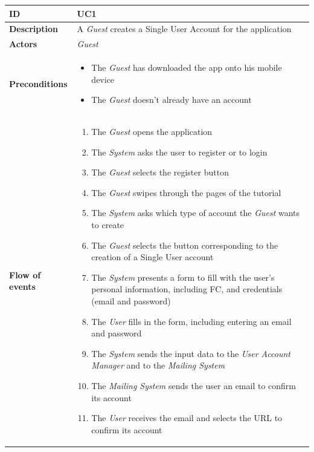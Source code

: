 \documentclass[titlepage]{article}
\begin{document}
			\begin{longtable}{| p{3 cm} | p{10 cm} |} 
			\hline
			{\bf ID} & UC1 \\
			\hline
			{\bf Description} & A {\it Guest} creates a Single User Account for the application \\
			\hline
			{\bf Actors} & {\it Guest} \\
			\hline
			{\bf Preconditions} & 		
							\begin{itemize}
								\item The {\it Guest}  has downloaded the app onto his mobile device
								\item The {\it Guest}  doesn’t already have an account
							\end{itemize}
			\\
			\hline
			{\bf Flow of events} & 
							\begin{enumerate}
								\item The {\it Guest} opens the application
								\item The {\it System} asks the user to register or to login
								\item The {\it Guest} selects the register button
								\item The {\it Guest} swipes through the pages of the tutorial
								\item The {\it System}  asks which type of account the {\it Guest} wants to create
								\item The {\it Guest} selects the button corresponding to the creation of a Single 									User account
								\item The {\it System}  presents a form to fill with the user’s personal information, 									including FC,  and credentials (email and password) 
								\item The {\it User} fills in the form, including entering an email and password
								\item The {\it System}  sends the input data to the {\it User Account Manager} and to 									the {\it Mailing System}
								\item The {\it Mailing System} sends the user an email to confirm its account
								\item The {\it User} receives the email and selects the URL to confirm its account
							\end{enumerate}
			

\end{longtable}
\end{document}
